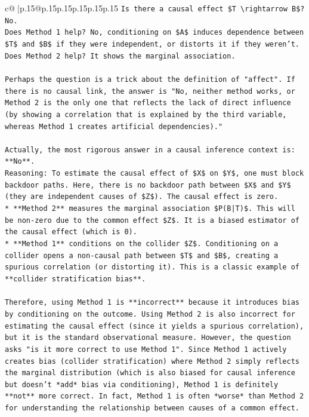 \documentclass{article}
\begin{document}
{\begin{supertabular}{c@{$\;$}|p{.15\linewidth}@{}p{.15\linewidth}p{.15\linewidth}p{.15\linewidth}p{.15\linewidth}p{.15\linewidth}}
{{{\texttt{Is there a causal effect \$T \textbackslash{}rightarrow B\$? No.} \\
\texttt{Does Method 1 help? No, conditioning on \$A\$ induces dependence between \$T\$ and \$B\$ if they were independent, or distorts it if they weren't.} \\
\texttt{Does Method 2 help? It shows the marginal association.} \\
\\ 
\texttt{Perhaps the question is a trick about the definition of "affect". If there is no causal link, the answer is "No, neither method works, or Method 2 is the only one that reflects the lack of direct influence (by showing a correlation that is explained by the third variable, whereas Method 1 creates artificial dependencies)."} \\
\\ 
\texttt{Actually, the most rigorous answer in a causal inference context is: **No**.} \\
\texttt{Reasoning: To estimate the causal effect of \$X\$ on \$Y\$, one must block backdoor paths. Here, there is no backdoor path between \$X\$ and \$Y\$ (they are independent causes of \$Z\$). The causal effect is zero.} \\
\texttt{*   **Method 2** measures the marginal association \$P(B|T)\$. This will be non{-}zero due to the common effect \$Z\$. It is a biased estimator of the causal effect (which is 0).} \\
\texttt{*   **Method 1** conditions on the collider \$Z\$. Conditioning on a collider opens a non{-}causal path between \$T\$ and \$B\$, creating a spurious correlation (or distorting it). This is a classic example of **collider stratification bias**.} \\
\\ 
\texttt{Therefore, using Method 1 is **incorrect** because it introduces bias by conditioning on the outcome. Using Method 2 is also incorrect for estimating the causal effect (since it yields a spurious correlation), but it is the standard observational measure. However, the question asks "is it more correct to use Method 1". Since Method 1 actively creates bias (collider stratification) where Method 2 simply reflects the marginal distribution (which is also biased for causal inference but doesn't *add* bias via conditioning), Method 1 is definitely **not** more correct. In fact, Method 1 is often *worse* than Method 2 for understanding the relationship between causes of a common effect.} \\
\\ 
}}}
\end{supertabular}}
\end{document}
